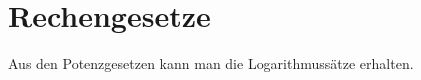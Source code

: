 	\section{Rechengesetze}

Aus den Potenzgesetzen kann man die Logarithmussätze erhalten.

\begin{enumerate}
\end{enumerate}